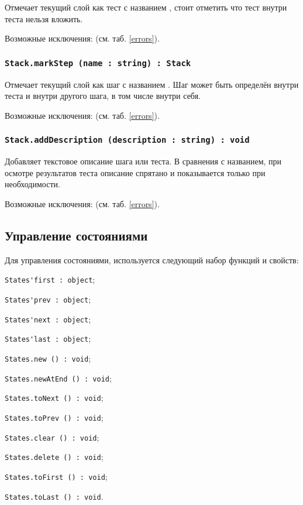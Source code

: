 Отмечает текущий слой как тест с названием , стоит отметить что тест внутри теста нельзя вложить.

Возможные исключения:  (см. таб. \ref{errors}).

\subsubsection{\lstinline|Stack.markStep (name : string) : Stack|}

Отмечает текущий слой как шаг с названием . Шаг может быть определён внутри теста и внутри другого шага, в том числе внутри себя.

Возможные исключения:  (см. таб. \ref{errors}).

\subsubsection{\lstinline|Stack.addDescription (description : string) : void|}

Добавляет текстовое описание шага или теста. В сравнения с названием, при осмотре результатов теста описание спрятано и показывается только при необходимости.

Возможные исключения:  (см. таб. \ref{errors}).

\subsection{Управление состояниями}

Для управления состояниями, используется следующий набор функций и свойств:
\begin{icItems}
	\item \lstinline|States'first : object|;
	\item \lstinline|States'prev : object|;
	\item \lstinline|States'next : object|;
	\item \lstinline|States'last : object|;
	\item \lstinline|States.new () : void|;
	\item \lstinline|States.newAtEnd () : void|;
	\item \lstinline|States.toNext () : void|;
	\item \lstinline|States.toPrev () : void|;
	\item \lstinline|States.clear () : void|;
	\item \lstinline|States.delete () : void|;
	\item \lstinline|States.toFirst () : void|;
	\item \lstinline|States.toLast () : void|.
\end{icItems}

